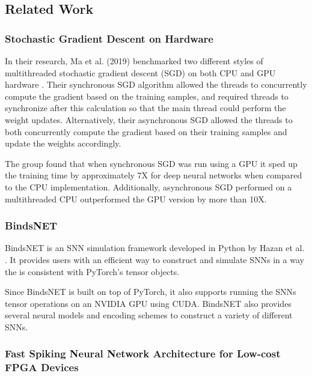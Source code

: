 \documentclass[journal]{IEEEtran}
\begin{document}
\subsection{Related Work}

\subsubsection{Stochastic Gradient Descent on Hardware}

In their research, Ma et al. (2019) benchmarked two different styles of multithreaded stochastic gradient descent (SGD) on both CPU and GPU hardware \cite{ma2019stochastic}. Their synchronous SGD algorithm allowed the threads to concurrently compute the gradient based on the training samples, and required threads to synchronize after this calculation so that the main thread could perform the weight updates. Alternatively, their asynchronous SGD allowed the threads to both concurrently compute the gradient based on their training samples and update the weights accordingly.

The group found that when synchronous SGD was run using a GPU it sped up the training time by approximately 7X for deep neural networks when compared to the CPU implementation. Additionally, asynchronous SGD performed on a multithreaded CPU outperformed the GPU version by more than 10X.

\subsubsection{BindsNET}

BindsNET is an SNN simulation framework developed in Python by Hazan et al. \cite{Hazan2018}. It provides users with an efficient way to construct and simulate SNNs in a way the is consistent with PyTorch's tensor objects.

Since BindsNET is built on top of PyTorch, it also supports running the SNNs tensor operations on an NVIDIA GPU using CUDA. BindsNET also provides several neural models and encoding schemes to construct a variety of different SNNs.

\subsubsection{Fast Spiking Neural Network Architecture for Low-cost FPGA Devices}
\par
\end{document}
